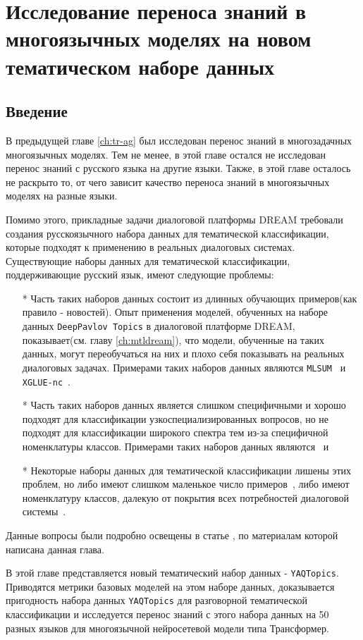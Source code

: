 \chapter{Исследование переноса знаний в многоязычных моделях на новом тематическом наборе данных}\label{ch:rutopics}
\section{Введение}
В предыдущей главе \ref{ch:tr-ag} был исследован перенос знаний в многозадачных многоязычных моделях. Тем не менее, в этой главе остался не исследован перенос знаний с русского языка на другие языки. Также, в этой главе осталось не раскрыто то, от чего зависит качество переноса знаний в многоязычных моделях на разные языки.

Помимо этого, прикладные задачи диалоговой платформы DREAM требовали создания русскоязычного набора данных для тематической классификации, которые подходят к применению в реальных диалоговых системах. Существующие наборы данных для тематической классификации, поддерживающие русский язык, имеют следующие проблемы:
\begin{itemize}
    \item[*] Часть таких наборов данных состоит из длинных обучающих примеров(как правило - новостей). Опыт применения моделей, обученных на наборе данных \texttt{DeepPavlov Topics} в диалоговой платформе DREAM, показывает(см. главу \ref{ch:mtldream}), что модели, обученные на таких данных, могут переобучаться на них и плохо себя показывать на реальных диалоговых задачах. Примерами таких наборов данных являются \texttt{MLSUM}~\cite{mlsum} и \texttt{XGLUE-nc}~\cite{xglue}.
    \item[*] Часть таких наборов данных является слишком специфичными и хорошо подходят для классификации узкоспециализированных вопросов, но не подходят для классификации широкого спектра тем из-за специфичной номенклатуры классов.  Примерами таких наборов данных являются~\cite{healthcare_facilities_reviews} и  ~\cite{pstu}
    \item[*] Некоторые наборы данных для тематической классификации лишены этих проблем, но либо имеют слишком маленькое число примеров~\cite{chatbotru}, либо имеют номенклатуру классов, далекую от покрытия всех потребностей диалоговой системы~\cite{massive}.
\end{itemize}
Данные вопросы были подробно освещены в статье \cite{rutopics}, по материалам которой написана данная глава. 

В этой главе представляется новый тематический набор данных - \texttt{YAQTopics}. Приводятся метрики базовых моделей на этом наборе данных, доказывается пригодность набора данных \texttt{YAQTopics} для разговорной тематической классификации и исследуется перенос знаний с этого набора данных на 50 разных языков для многоязычной нейросетевой модели типа Трансформер. %

